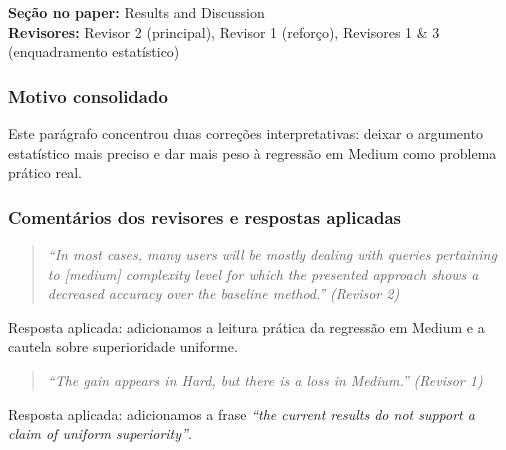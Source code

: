 \documentclass[11pt,a4paper]{article}
\begin{document}
\textbf{Seção no paper:} Results and Discussion\\
\textbf{Revisores:} Revisor 2 (principal), Revisor 1 (reforço), Revisores 1 \& 3 (enquadramento estatístico)

\subsubsection*{Motivo consolidado}

Este parágrafo concentrou duas correções interpretativas: deixar o argumento estatístico mais preciso e dar mais peso à regressão em Medium como problema prático real.

\subsubsection*{Comentários dos revisores e respostas aplicadas}

\begin{quote}
\textit{``In most cases, many users will be mostly dealing with queries pertaining to [medium] complexity level for which the presented approach shows a decreased accuracy over the baseline method.''}
\hfill\textit{(Revisor 2)}
\end{quote}

\noindent Resposta aplicada: adicionamos a leitura prática da regressão em Medium e a cautela sobre superioridade uniforme.

\begin{quote}
\textit{``The gain appears in Hard, but there is a loss in Medium.''}
\hfill\textit{(Revisor 1)}
\end{quote}

\noindent Resposta aplicada: adicionamos a frase \textit{``the current results do not support a claim of uniform superiority''}.
\end{document}
